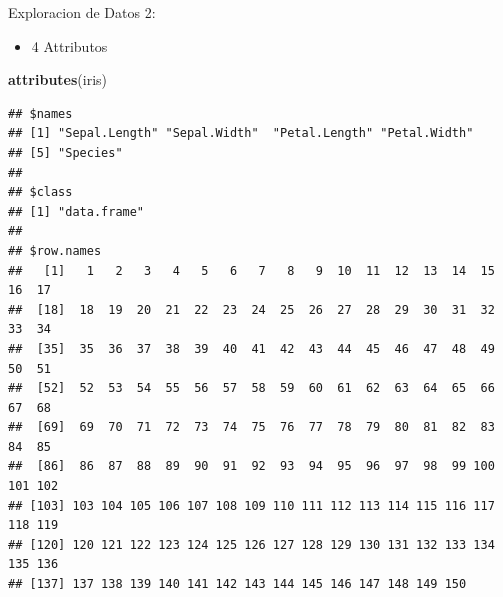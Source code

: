 \documentclass[ignorenonframetext,]{beamer}
\newenvironment{Shaded}{\begin{snugshade}}{\end{snugshade}}
\newcommand{\KeywordTok}[1]{\textcolor[rgb]{0.13,0.29,0.53}{\textbf{#1}}}
\newcommand{\NormalTok}[1]{#1}
\providecommand{\tightlist}{%
  \setlength{\itemsep}{0pt}\setlength{\parskip}{0pt}}
\begin{document}
\begin{frame}[fragile]{Exploracion de Datos 2:}

\begin{itemize}
\tightlist
\item
  4 Attributos
\end{itemize}

\begin{Shaded}
\begin{Highlighting}[]
\KeywordTok{attributes}\NormalTok{(iris)}
\end{Highlighting}
\end{Shaded}

\begin{verbatim}
## $names
## [1] "Sepal.Length" "Sepal.Width"  "Petal.Length" "Petal.Width" 
## [5] "Species"     
## 
## $class
## [1] "data.frame"
## 
## $row.names
##   [1]   1   2   3   4   5   6   7   8   9  10  11  12  13  14  15  16  17
##  [18]  18  19  20  21  22  23  24  25  26  27  28  29  30  31  32  33  34
##  [35]  35  36  37  38  39  40  41  42  43  44  45  46  47  48  49  50  51
##  [52]  52  53  54  55  56  57  58  59  60  61  62  63  64  65  66  67  68
##  [69]  69  70  71  72  73  74  75  76  77  78  79  80  81  82  83  84  85
##  [86]  86  87  88  89  90  91  92  93  94  95  96  97  98  99 100 101 102
## [103] 103 104 105 106 107 108 109 110 111 112 113 114 115 116 117 118 119
## [120] 120 121 122 123 124 125 126 127 128 129 130 131 132 133 134 135 136
## [137] 137 138 139 140 141 142 143 144 145 146 147 148 149 150
\end{verbatim}

\end{frame}
\end{document}

